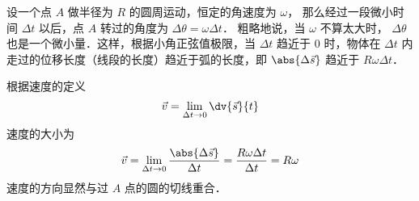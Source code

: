

设一个点 $A$ 做半径为 $R$ 的圆周运动，恒定的角速度为 $\omega $， 那么经过一段微小时间 $\Delta t$ 以后，点 $A$ 转过的角度为 $\Delta \theta  = \omega \Delta t$． 粗略地说，当 $\omega $ 不算太大时， $\Delta \theta $ 也是一个微小量．这样，根据小角正弦值极限，当 $\Delta t$ 趋近于 $0$ 时，物体在 $\Delta t$ 内走过的位移长度（线段的长度）趋近于弧的长度，即 $\abs{\Delta \vec s}$ 趋近于 $R\omega \Delta t$． 

根据速度的定义 
\begin{equation}
\vec v = \lim_{\Delta t \to 0} \dv{\vec s}{t}
\end{equation}
速度的大小为
\begin{equation}
\vec v = \lim_{\Delta t \to 0} \frac{\abs{\Delta \vec s}}{\Delta t} = \frac{R\omega \Delta t}{\Delta t} = R\omega 
\end{equation}
速度的方向显然与过 $A$ 点的圆的切线重合．











